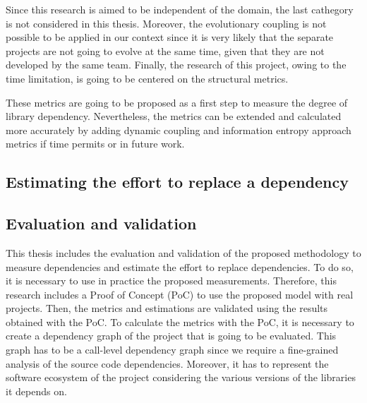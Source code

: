 \blankl
Since this research is aimed to be independent of the domain, the last cathegory is not considered in this thesis. Moreover, the evolutionary coupling is not possible to be applied in our context since it is very likely that the separate projects are not going to evolve at the same time, given that they are not developed by the same team. Finally, the research of this project, owing to the time limitation, is going to be centered on the structural metrics.

These metrics are going to be proposed as a first step to measure the degree of library dependency. Nevertheless, the metrics can be extended and calculated more accurately by adding dynamic coupling and information entropy approach metrics if time permits or in future work.


\subsection{Estimating the effort to replace a dependency}

\begin{comment}
  In order to estimate the effort needed to replace a dependency in a project, there are different variables that need to be considered first:

  - How much code do I need to change - estimate based on the usage of the Dependency
  - Refactoring adjustment
  - How many methods do I need to change.
  - The impact of the change - inside the project.
\end{comment}

\subsection{Evaluation and validation} 
This thesis includes the evaluation and validation of the proposed methodology to measure dependencies and estimate the effort to replace dependencies. To do so, it is necessary to use in practice the proposed measurements. Therefore, this research includes a Proof of Concept (PoC) to use the proposed model with real projects. Then, the metrics and estimations are validated using the results obtained with the PoC.
To calculate the metrics with the PoC, it is necessary to create a dependency graph of the project that is going to be evaluated. This graph has to be a call-level dependency graph since we require a fine-grained analysis of the source code dependencies. Moreover, it has to represent the software ecosystem of the project considering the various versions of the libraries it depends on.

